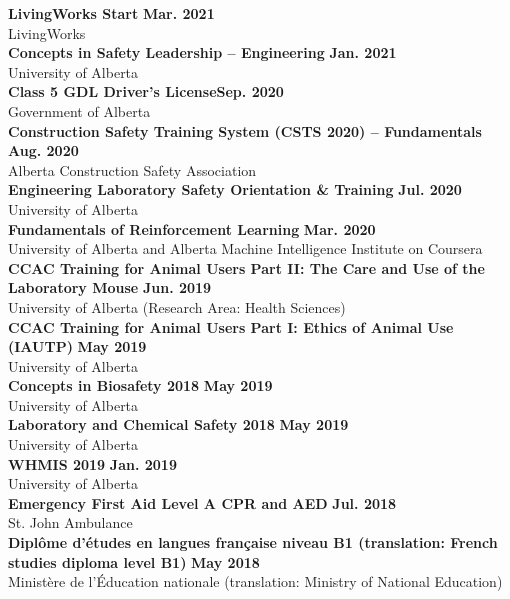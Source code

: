 \documentclass{article}
\begin{document}
\textbf{LivingWorks Start} \hfill \textbf{Mar. 2021}\\
LivingWorks\\[0.5em]
\textbf{Concepts in Safety Leadership -- Engineering} \hfill \textbf{Jan. 2021}\\
University of Alberta\\[0.5em]
\textbf{Class 5 GDL Driver's License}\hfill \textbf{Sep. 2020}\\
Government of Alberta\\[0.5em]
\textbf{Construction Safety Training System (CSTS 2020) -- Fundamentals} \hfill \textbf{Aug. 2020}\\
Alberta Construction Safety Association\\[0.5em]
\textbf{Engineering Laboratory Safety Orientation \& Training} \hfill \textbf{Jul. 2020}\\
University of Alberta\\[0.5em]
\textbf{Fundamentals of Reinforcement Learning} \hfill \textbf{Mar. 2020}\\
University of Alberta and Alberta Machine Intelligence Institute on Coursera\\[0.5em]
\textbf{CCAC Training for Animal Users Part II: The Care and Use of the Laboratory Mouse} \hfill \textbf{Jun. 2019}\\
University of Alberta (Research Area: Health Sciences)\\[0.5em]
\textbf{CCAC Training for Animal Users Part I: Ethics of Animal Use (IAUTP)} \hfill \textbf{May 2019}\\
University of Alberta\\[0.5em]
\textbf{Concepts in Biosafety 2018} \hfill \textbf{May 2019}\\
University of Alberta\\[0.5em]
\textbf{Laboratory and Chemical Safety 2018} \hfill \textbf{May 2019}\\
University of Alberta\\[0.5em]
\textbf{WHMIS 2019} \hfill \textbf{Jan. 2019}\\
University of Alberta\\[0.5em]
\textbf{Emergency First Aid Level A CPR and AED} \hfill \textbf{Jul. 2018}\\
St. John Ambulance\\[0.5em]
\textbf{Dipl\^ome d'\'etudes en langues fran\c{c}aise niveau B1 (translation: French studies diploma level B1)} \hfill \textbf{May 2018}\\
Minist\`ere de l'\'Education nationale (translation: Ministry of National Education)
\end{document}
